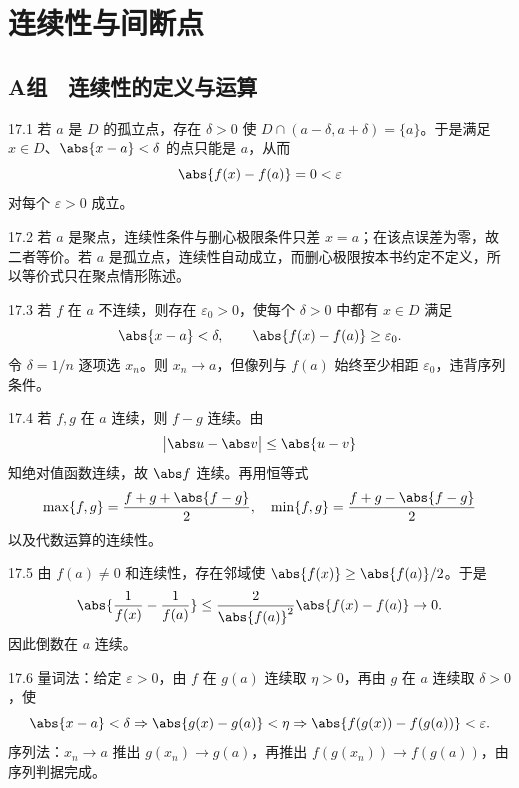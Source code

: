 \chapter{连续性与间断点}

\section*{A组　连续性的定义与运算}

\begin{solution}{17.1}
若 \(a\) 是 \(D\) 的孤立点，存在 \(\delta>0\) 使 \(D\cap(a-\delta,a+\delta)=\{a\}\)。于是满足 \(x\in D\)、\(\abs{x-a}<\delta\) 的点只能是 \(a\)，从而
\[
 \abs{f(x)-f(a)}=0<\varepsilon
\]
对每个 \(\varepsilon>0\) 成立。
\end{solution}

\begin{solution}{17.2}
若 \(a\) 是聚点，连续性条件与删心极限条件只差 \(x=a\)；在该点误差为零，故二者等价。若 \(a\) 是孤立点，连续性自动成立，而删心极限按本书约定不定义，所以等价式只在聚点情形陈述。
\end{solution}

\begin{solution}{17.3}
若 \(f\) 在 \(a\) 不连续，则存在 \(\varepsilon_0>0\)，使每个 \(\delta>0\) 中都有 \(x\in D\) 满足
\[
 \abs{x-a}<\delta,\qquad\abs{f(x)-f(a)}\ge\varepsilon_0.
\]
令 \(\delta=1/n\) 逐项选 \(x_n\)。则 \(x_n\to a\)，但像列与 \(f(a)\) 始终至少相距 \(\varepsilon_0\)，违背序列条件。
\end{solution}

\begin{solution}{17.4}
若 \(f,g\) 在 \(a\) 连续，则 \(f-g\) 连续。由
\[
 \bigl|\abs u-\abs v\bigr|\le\abs{u-v}
\]
知绝对值函数连续，故 \(\abs f\) 连续。再用恒等式
\[
 \max\{f,g\}=\frac{f+g+\abs{f-g}}2,\quad
 \min\{f,g\}=\frac{f+g-\abs{f-g}}2
\]
以及代数运算的连续性。
\end{solution}

\begin{solution}{17.5}
由 \(f(a)\ne0\) 和连续性，存在邻域使 \(\abs{f(x)}\ge\abs{f(a)}/2\)。于是
\[
 \abs{\frac1{f(x)}-\frac1{f(a)}}
 \le\frac2{\abs{f(a)}^2}\abs{f(x)-f(a)}\to0.
\]
因此倒数在 \(a\) 连续。
\end{solution}

\begin{solution}{17.6}
量词法：给定 \(\varepsilon>0\)，由 \(f\) 在 \(g(a)\) 连续取 \(\eta>0\)，再由 \(g\) 在 \(a\) 连续取 \(\delta>0\)，使
\[
 \abs{x-a}<\delta\Rightarrow\abs{g(x)-g(a)}<\eta
\Rightarrow\abs{f(g(x))-f(g(a))}<\varepsilon.
\]
序列法：\(x_n\to a\) 推出 \(g(x_n)\to g(a)\)，再推出 \(f(g(x_n))\to f(g(a))\)，由序列判据完成。
\end{solution}

